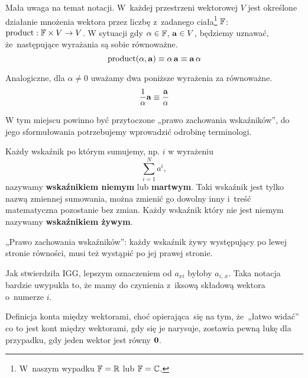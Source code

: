 \documentclass[a4paper,11pt]{article}
\begin{document}
 Mała uwaga na temat notacji. W~każdej przestrzeni wektorowej $V$
jest określone działanie mnożenia wektora przez liczbę z~zadanego
ciała\footnote{W~naszym wypadku $\mathbb{F} = \mathbb{R}$ lub $\mathbb{F} = \mathbb{C}$.} $\mathbb{F}$:
$\textrm{product} : \mathbb{F} \times V \to V$. W sytuacji gdy $\alpha \in \mathbb{F}$,
$\mathbf{a} \in V$, będziemy uznawać, że~następujące wyrażania są sobie
równoważne.
\begin{equation}
  \label{eq:SkalmierskiMechanika-03}
  \textrm{product}( \alpha, \mathbf{a} ) \equiv \alpha \, \mathbf{a} \equiv \mathbf{a} \, \alpha
\end{equation}

Analogiczne, dla $\alpha \neq 0$ uważamy dwa poniższe wyrażenia za równoważne.
\begin{equation}
  \label{eq:SkalmierskiMechanika-04}
  \frac{ 1 }{ \alpha } \mathbf{a} \equiv \frac{ \mathbf{a} }{ \alpha }
\end{equation}

\vspace{\spaceFour}



 W tym miejscu powinno być przytoczone „prawo zachowania wskaźników”, do jego sformułowania potrzebujemy wprowadzić odrobinę terminologi.

Każdy wskaźnik po którym sumujemy, np. $i$ w wyrażeniu
\begin{equation}
  \label{eq:SkalmierskiMechanika-05}
  \sum_{ i = 1 }^{ N } a^{ i },
\end{equation}
nazywamy \textbf{wskaźnikiem niemym} lub \textbf{martwym}. Taki wskaźnik
jest tylko nazwą zmiennej sumowania, można zmienić go dowolny inny i~treść
matematyczna pozostanie bez zmian. Każdy wskaźnik który nie jest niemym
nazywamy \textbf{wskaźnikiem żywym}.

„Prawo zachowania wskaźników”: każdy wskaźnik żywy występujący po lewej
stronie równości, musi też wystąpić po jej prawej stronie.

\vspace{\spaceFour}



 Jak stwierdziła IGG, lepszym oznaczeniem od $a_{ xi }$ byłoby
$a_{ i,\, x }$. Taka notacja bardzie uwypukla to, że mamy do czynienia
z~iksową składową wektora o~numerze $i$.

\vspace{\spaceFour}



 Definicja konta między wektorami, choć opierająca~się na tym,
że~„łatwo widać” co to jest kont między wektorami, gdy się je narysuje,
zostawia pewną lukę dla przypadku, gdy jeden wektor jest równy
$\mathbf{0}$.
\end{document}
